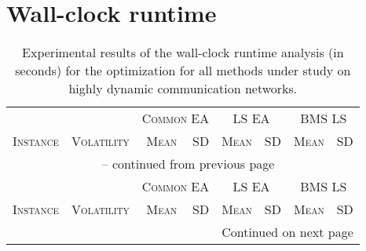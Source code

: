 \documentclass{scrartcl}
\begin{document}
\section{Wall-clock runtime}
\begin{center}
\footnotesize
\begin{longtable}{lrrrrrrr}
    \caption{Experimental results of the wall-clock runtime analysis (in seconds) for the optimization for all methods under study on highly dynamic communication networks.}\\
    \toprule
    &  & \multicolumn{2}{c}{\textsc{Common EA}} & \multicolumn{2}{c}{LS EA} & \multicolumn{2}{c}{BMS LS} \\
        \cmidrule{3-8}
         \textsc{Instance} & \textsc{Volatility} & \textsc{Mean} & \textsc{SD} & \textsc{Mean} & \textsc{SD} & \textsc{Mean} & \textsc{SD} \\
    \midrule
    \endfirsthead
    
    \multicolumn{8}{c}{\tablename~\thetable{} -- continued from previous page}\\
    &  & \multicolumn{2}{c}{\textsc{Common EA}} & \multicolumn{2}{c}{LS EA} & \multicolumn{2}{c}{BMS LS} \\
        \cmidrule{3-8}
         \textsc{Instance} & \textsc{Volatility} & \textsc{Mean} & \textsc{SD} & \textsc{Mean} & \textsc{SD} & \textsc{Mean} & \textsc{SD} \\
    \midrule
    \endhead
    
    \midrule
    \multicolumn{8}{r}{Continued on next page}
    \endfoot
    \bottomrule
    \endlastfoot
    

\end{longtable}
\end{center}
\end{document}

